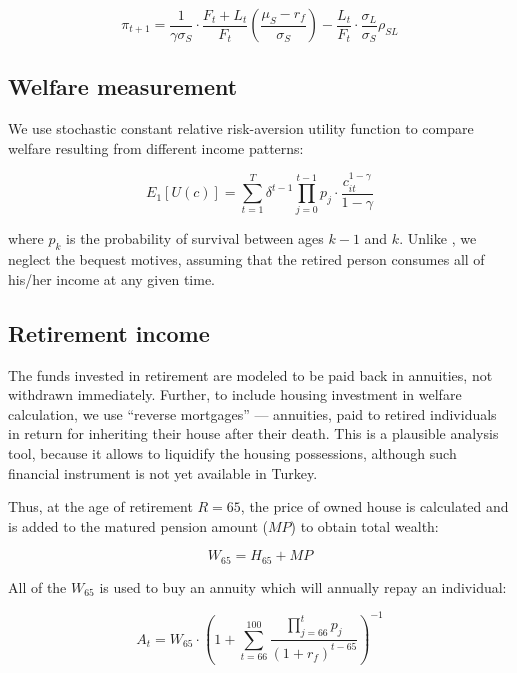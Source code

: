 \documentclass[]{elsarticle}
\begin{document}
\begin{equation}\label{eq:munkno}
	\pi_{t+1} = \frac{1}{\gamma \sigma_S} \cdot \frac{F_t + L_t}{F_t} \left( \frac{\mu_S - r_f}{\sigma_S} \right) - \frac{L_t}{F_t} \cdot \frac{\sigma_L}{\sigma_S} \rho_{SL}
\end{equation}


\subsection{Welfare measurement}

We use stochastic constant relative risk-aversion utility function to compare welfare resulting from different income patterns:

\begin{equation}
	E_1[U(c)] = \displaystyle\sum^T_{t=1} \delta^{t-1} \displaystyle\prod^{t-1}_{j=0} p_j \cdot \frac{c^{1-\gamma}_{it}}{1-\gamma}
\end{equation}

where $p_k$ is the probability of survival between ages $k-1$ and $k$. Unlike \citet{cgm}, we neglect the bequest motives, assuming that the retired person consumes all of his/her income at any given time. 


\subsection{Retirement income}

The funds invested in retirement are modeled to be paid back in annuities, not withdrawn immediately. Further, to include housing investment in welfare calculation, we use ``reverse mortgages'' --- annuities, paid to retired individuals in return for inheriting their house after their death. This is a plausible analysis tool, because it allows to liquidify the housing possessions, although such financial instrument is not yet available in Turkey. 

Thus, at the age of retirement $R = 65$, the price of owned house is calculated and is added to the matured pension amount ($MP$) to obtain total wealth:

\begin{equation}
	W_{65} = H_{65} + MP
\end{equation}

All of the $W_{65}$ is used to buy an annuity which will annually repay an individual:

\begin{equation}
	A_t = W_{65} \cdot \left(1+\sum^{100}_{t=66} \frac{\prod^{t}_{j=66} p_j }{(1+r_f)^{t-65}} \right)^{-1}
\end{equation}
\end{document}
